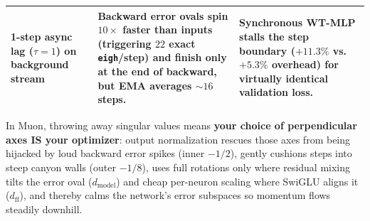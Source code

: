 \documentclass[11pt]{article}
\newcommand{\dm}{d_{\mathrm{model}}}
\newcommand{\dff}{d_{\mathrm{ff}}}
\newcommand{\mname}[1]{#1}
\begin{document}
\begin{table}[ht]
\begin{tabular}{@{}>{\raggedright\arraybackslash}p{}>{\raggedright\arraybackslash}p{}>{\raggedright\arraybackslash}p{}@{}}
    \textbf{1-step async lag ($\tau = 1$) on background stream} & Backward error ovals spin $10\times$ faster than inputs (triggering $22$ exact \texttt{eigh}/step) and finish only at the end of backward, but EMA averages $\sim 16$ steps. & Synchronous \mname{WT-MLP} stalls the step boundary ($+11.3\%$ vs.\ $+5.3\%$ overhead) for virtually identical validation loss. \\
    \bottomrule
  \end{tabular}
\end{table}

\begin{keyfinding}
In \mname{Muon}, throwing away singular values means \textbf{your choice of perpendicular axes IS your optimizer}: output normalization rescues those axes from being hijacked by loud backward error spikes (inner $-1/2$), gently cushions steps into steep canyon walls (outer $-1/8$), uses full rotations only where residual mixing tilts the error oval ($\dm$) and cheap per-neuron scaling where SwiGLU aligns it ($\dff$), and thereby calms the network's error subspaces so momentum flows steadily downhill.
\end{keyfinding}



\end{document}
